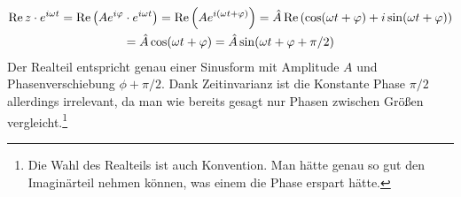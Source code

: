 \begin{gather*}
\Re z\cdot e^{i\omega t}
    = \Re\qty(Ae^{i\varphi} \cdot e^{i\omega t})
    = \Re\qty(Ae^{i(\omega t + \varphi)})
    = \hat A\Re\qty(\cos(\omega t + \varphi) + i\sin(\omega t + \varphi)) \\
    = \hat A\cos(\omega t  +\varphi)
    = \hat A\sin(\omega t + \varphi + \pi/2)
\end{gather*}
Der Realteil entspricht genau einer Sinusform mit Amplitude $A$ und Phasenverschiebung $\phi+\pi/2$. Dank Zeitinvarianz
ist die Konstante Phase $\pi/2$ allerdings irrelevant, da man wie bereits gesagt nur Phasen zwischen Größen
vergleicht.\footnote{Die Wahl des Realteils ist auch Konvention. Man hätte genau so gut den Imaginärteil nehmen können,
was einem die Phase erspart hätte.}
